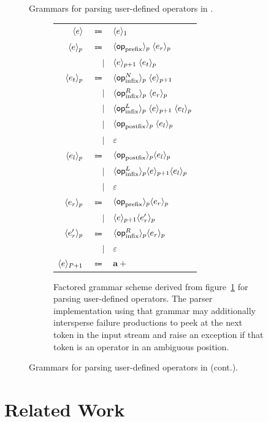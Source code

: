 {\begin{figure}[!htb]
\begin{subfigure}{\linewidth}
{}
\label{figure:user-defined-operators-initial-grammar-scheme}
\end{subfigure}
\caption[Grammars for parsing user-defined operators in \Beluga.]{Grammars for parsing user-defined operators in \Beluga.}
\label{figure:user-defined-operators-grammar}
\end{figure}%
\begin{figure}\ContinuedFloat
\begin{subfigure}{\linewidth}
\centering
\begin{tabular}{rrl}
$ \langle e\rangle $ & $ \Coloneqq $ & $ \langle e\rangle_1 $\\
$ \langle e\rangle_p $ & $ \Coloneqq $ & $ \langle\mathsf{op}_{\text{prefix}}\rangle_p \; \langle e_r\rangle_p $\\
& $ \mid $ & $ \langle e\rangle_{p + 1} \; \langle e_t\rangle_p $\\
$ \langle e_t\rangle_p $ & $ \Coloneqq $ & $ \langle\mathsf{op}_{\text{infix}}^N\rangle_p \; \langle e\rangle_{p + 1} $\\
& $ \mid $ & $ \langle\mathsf{op}_{\text{infix}}^R\rangle_p \; \langle e_r\rangle_p $\\
& $ \mid $ & $ \langle\mathsf{op}_{\text{infix}}^L\rangle_p \; \langle e\rangle_{p + 1} \; \langle e_l\rangle_p $\\
& $ \mid $ & $ \langle\mathsf{op}_{\text{postfix}}\rangle_p \; \langle e_l\rangle_p $\\
& $ \mid $ & $ \varepsilon $\\
$ \langle e_l\rangle_p $ & $ \Coloneqq $ & $ \langle\mathsf{op}_{\text{postfix}}\rangle_p \langle e_l\rangle_p $\\
& $ \mid $ & $ \langle\mathsf{op}_{\text{infix}}^L\rangle_p \langle e\rangle_{p + 1} \langle e_l\rangle_p $\\
& $ \mid $ & $ \varepsilon $\\
$ \langle e_r\rangle_p $ & $ \Coloneqq $ & $ \langle\mathsf{op}_{\text{prefix}}\rangle_p \langle e_r\rangle_p $\\
& $ \mid $ & $ \langle e\rangle_{p + 1} \langle e_r'\rangle_p $\\
$ \langle e_r'\rangle_p $ & $ \Coloneqq $ & $ \langle\mathsf{op}_{\text{infix}}^R\rangle_p \langle e_r\rangle_p $\\
& $ \mid $ & $ \varepsilon $\\
$ \langle e\rangle_{P + 1} $ & $ \Coloneqq $ & $ \mathbf{a}+ $
\end{tabular}
\caption{Factored grammar scheme derived from figure~\ref{figure:user-defined-operators-initial-grammar-scheme} for parsing user-defined operators. The parser implementation using that grammar may additionally intersperse failure productions to peek at the next token in the input stream and raise an exception if that token is an operator in an ambiguous position.}
\label{figure:user-defined-operators-final-grammar-scheme}
\end{subfigure}
\caption[]{Grammars for parsing user-defined operators in \Beluga (cont.).}
\end{figure}}

\section{Related Work}

